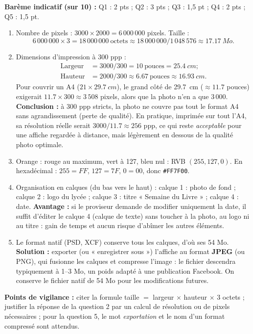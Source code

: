 \documentclass[11pt]{article}
\begin{document}
\begin{corrige}
\textbf{Barème indicatif (sur 10) :} Q1 : 2 pts ; Q2 : 3 pts ; Q3 : 1,5 pt ; Q4 : 2 pts ; Q5 : 1,5 pt.

\begin{enumerate}
  \item Nombre de pixels : $3000 \times 2000 = 6\,000\,000$ pixels. Taille :
  \[ 6\,000\,000 \times 3 = 18\,000\,000~\text{octets} \approx 18\,000\,000 / 1\,048\,576 \approx \SI{17,17}{Mo}. \]
  \item Dimensions d'impression à 300 ppp :
  \begin{align*}
  \text{Largeur} &= 3000 / 300 = 10~\text{pouces} = \SI{25,4}{cm} ;\\
  \text{Hauteur} &= 2000 / 300 \approx \num{6,67}~\text{pouces} \approx \SI{16,93}{cm}.
  \end{align*}
  Pour couvrir un A4 ($21 \times \SI{29,7}{cm}$), le grand côté de \SI{29,7}{cm} ($\approx \num{11,7}$ pouces) exigerait $\num{11,7} \times 300 \approx 3\,508$ pixels, alors que la photo n'en a que $3\,000$. \textbf{Conclusion :} à 300 ppp stricts, la photo ne couvre pas tout le format A4 sans agrandissement (perte de qualité). En pratique, imprimée sur tout l'A4, sa résolution réelle serait $3000 / \num{11,7} \approx \num{256}$ ppp, ce qui reste \emph{acceptable} pour une affiche regardée à distance, mais légèrement en dessous de la qualité photo optimale.
  \item Orange : rouge au maximum, vert à 127, bleu nul : RVB $(255, 127, 0)$. En hexadécimal : $255 = FF$, $127 = 7F$, $0 = 00$, donc \texttt{\#FF7F00}.
  \item Organisation en calques (du bas vers le haut) : calque 1 : photo de fond ; calque 2 : logo du lycée ; calque 3 : titre « Semaine du Livre » ; calque 4 : date. \textbf{Avantage :} si le proviseur demande de modifier uniquement la date, il suffit d'éditer le calque 4 (calque de texte) sans toucher à la photo, au logo ni au titre : gain de temps et aucun risque d'abîmer les autres éléments.
  \item Le format natif (PSD, XCF) conserve tous les calques, d'où ses 54 Mo. \textbf{Solution :} exporter (ou « enregistrer sous ») l'affiche au format \textbf{JPEG} (ou PNG), qui fusionne les calques et compresse l'image : le fichier descendra typiquement à 1--3 Mo, un poids adapté à une publication Facebook. On conserve le fichier natif de 54 Mo pour les modifications futures.
\end{enumerate}
\textbf{Points de vigilance :} citer la formule taille $=$ largeur $\times$ hauteur $\times$ 3 octets ; justifier la réponse de la question 2 par un calcul de résolution ou de pixels nécessaires ; pour la question 5, le mot \emph{exportation} et le nom d'un format compressé sont attendus.
\end{corrige}
\end{document}
